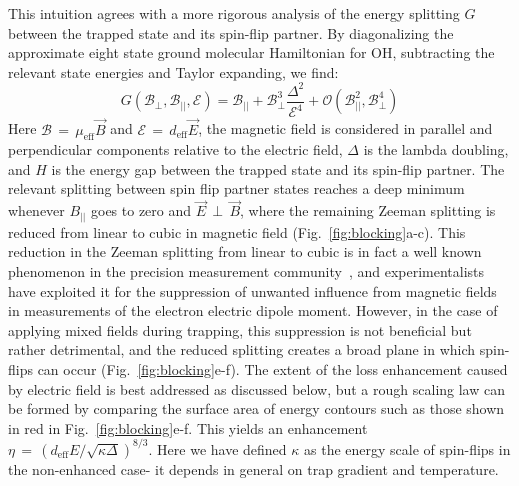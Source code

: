 \documentclass[%
 reprint,
 amsmath,amssymb,
 aps,
prl,
]{revtex4-1}
\newcommand{\epb}{{$\vec{E}\,{\perp}\,\vec{B}$}}
\begin{document}
This intuition agrees with a more rigorous analysis of the energy splitting $G$ between the trapped state and its spin-flip partner. 
By diagonalizing the approximate eight state ground molecular Hamiltonian for OH, subtracting the relevant state energies and Taylor expanding, we find:
\begin{equation}
G(\mathcal{B}_\perp,\mathcal{B}_{||},\mathcal{E}) = \mathcal{B}_{||} + \mathcal{B}_\perp^3\frac{\Delta^2}{\mathcal{E}^4} + \mathcal{O}(\mathcal{B}_{||}^2,\mathcal{B}_\perp^4)
\end{equation}
Here $\mathcal{B}\,{=}\,\mu_\text{eff}\vec{B}$ and $\mathcal{E}\,{=}\,d_\text{eff}\vec{E}$, the magnetic field is considered in parallel and perpendicular components relative to the electric field, $\Delta$ is the lambda doubling, and $H$ is the energy gap between the trapped state and its spin-flip partner.
The relevant splitting between spin flip partner states reaches a deep minimum whenever $B_{||}$ goes to zero and \epb, where the remaining Zeeman splitting is reduced from linear to cubic in magnetic field (Fig.~\ref{fig:blocking}a-c).
This reduction in the Zeeman splitting from linear to cubic is in fact a well known phenomenon in the precision measurement community~\cite{Player1970,Hudson2002}, and experimentalists have exploited it for the suppression of unwanted influence from magnetic fields in measurements of the electron electric dipole moment.
However, in the case of applying mixed fields during trapping, this suppression is not beneficial but rather detrimental, and the reduced splitting creates a broad plane in which spin-flips can occur (Fig.~\ref{fig:blocking}e-f).
The extent of the loss enhancement caused by electric field is best addressed as discussed below, but a rough scaling law can be formed by comparing the surface area of energy contours such as those shown in red in Fig.~\ref{fig:blocking}e-f.
This yields an enhancement $\eta \,{=}\, (d_\text{eff}E/\sqrt{\kappa\Delta})^{8/3}$. 
Here we have defined $\kappa$ as the energy scale of spin-flips in the non-enhanced case- it depends in general on trap gradient and temperature.
\end{document}
